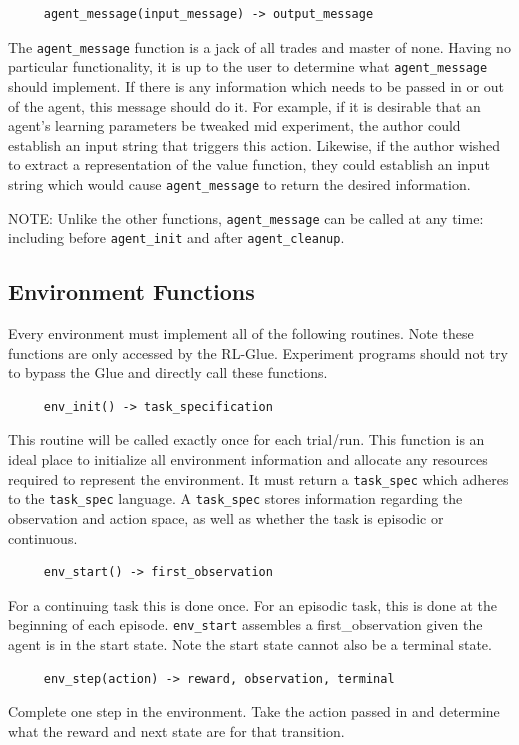 \documentclass[11pt]{article}
\begin{document}
\begin{verbatim}
     agent_message(input_message) -> output_message
\end{verbatim}     
The \texttt{agent\_message} function is a jack of all trades and master of none. Having no particular functionality, it is up to the user to determine what \texttt{agent\_message} should implement. If there is any information which needs to be passed in or out of the agent, this message should do it. For example, if it is desirable that an agent's learning parameters be tweaked mid experiment, the author could establish an input string that triggers this action. Likewise, if the author wished to extract a representation of the value function, they could establish an input string which would cause \texttt{agent\_message} to return the desired information.

NOTE: Unlike the other functions, \texttt{agent\_message} can be called at any time: including before \texttt{agent\_init} and after \texttt{agent\_cleanup}.
                          
\subsection{Environment Functions}
\label{Eref}
Every environment must implement all of the following routines. Note these functions are only accessed by the RL-Glue. Experiment programs should not try to bypass the Glue and directly call these functions.
\begin{verbatim}
     env_init() -> task_specification
\end{verbatim}
This routine will be called exactly once for each trial/run. This function is an ideal place to initialize all environment information and allocate any resources required to represent the environment. It must return a \texttt{task\_spec} which adheres to the \texttt{task\_spec} language. A \texttt{task\_spec} stores information regarding the observation and action space, as well as whether the task is episodic or continuous.

\begin{verbatim}
     env_start() -> first_observation\end{verbatim}
For a continuing task this is done once. For an episodic task, this is done at the beginning of each episode. \texttt{env\_start} assembles a first\_observation given the agent is in the start state. Note the start state cannot also be a terminal state.

\begin{verbatim}
     env_step(action) -> reward, observation, terminal\end{verbatim}
Complete one step in the environment. Take the action passed in and determine what the reward and next state are for that transition.
\end{document}
